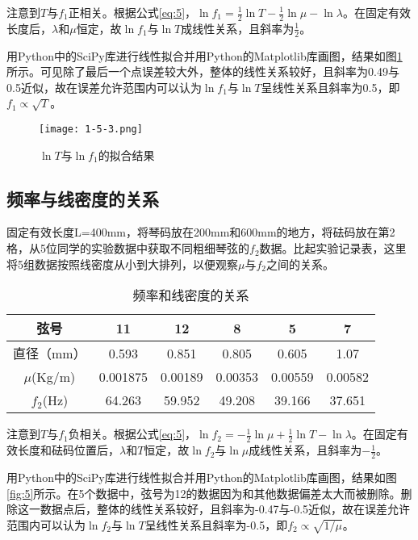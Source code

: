 \documentclass[12pt]{article}
\begin{document}
注意到$T$与$f_1$正相关。根据公式\ref{eq:5}，$\ln f_1=\frac{1}{2}\ln T - \frac{1}{2}\ln\mu - \ln\lambda$。在固定有效长度后，$\lambda$和$\mu$恒定，故$\ln f_1$与$\ln T$成线性关系，且斜率为$\frac{1}{2}$。

用Python中的SciPy库进行线性拟合并用Python的Matplotlib库画图，结果如图\ref{fig:4}所示。可见除了最后一个点误差较大外，整体的线性关系较好，且斜率为0.49与0.5近似，故在误差允许范围内可以认为$\ln f_1$与$\ln T$呈线性关系且斜率为0.5，即$f_1 \propto \sqrt{T}$。

\begin{figure}[htbp]
    \centering
    \texttt{[image: 1-5-3.png]}
    \caption{$\ln T$与$\ln f_1$的拟合结果}
    \label{fig:4}
\end{figure}

\subsection{频率与线密度的关系}
固定有效长度L=400mm，将琴码放在200mm和600mm的地方，将砝码放在第2格，从5位同学的实验数据中获取不同粗细琴弦的$f_2$数据。比起实验记录表，这里将5组数据按照线密度从小到大排列，以便观察$\mu$与$f_2$之间的关系。

\begin{table}[htbp]
    \centering
    \begin{tabular}{|c|c|c|c|c|c|}
        \hline
        弦号   & 11   & 12   & 8    & 5    & 7 \\
        \hline
        直径（mm） & 0.593 & 0.851 & 0.805 & 0.605 & 1.07 \\
        \hline
        $\mu$(Kg/m) & 0.001875 & 0.00189 & 0.00353 & 0.00559 & 0.00582 \\
        \hline
        $f_2$(Hz)   & 64.263 & 59.952 & 49.208 & 39.166 & 37.651 \\
        \hline
    \end{tabular}%
    \caption{频率和线密度的关系}
\end{table}

注意到$T$与$f_1$负相关。根据公式\ref{eq:5}，$\ln f_2 = -\frac{1}{2}\ln\mu + \frac{1}{2}\ln T - \ln\lambda$。在固定有效长度和砝码位置后，$\lambda$和$T$恒定，故$\ln f_2$与$\ln \mu$成线性关系，且斜率为$-\frac{1}{2}$。

用Python中的SciPy库进行线性拟合并用Python的Matplotlib库画图，结果如图\ref{fig:5}所示。在5个数据中，弦号为12的数据因为和其他数据偏差太大而被删除。删除这一数据点后，整体的线性关系较好，且斜率为-0.47与-0.5近似，故在误差允许范围内可以认为$\ln f_2$与$\ln T$呈线性关系且斜率为-0.5，即$f_2 \propto \sqrt{1/\mu}$。
\end{document}
